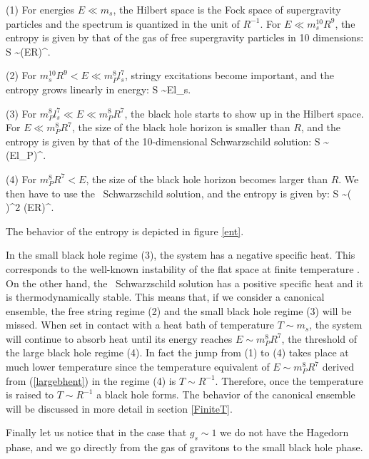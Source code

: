 \noindent
(1) For energies $E \ll m_s$, the Hilbert space is the
Fock space of supergravity particles and the spectrum is
quantized in the unit of $R^{-1}$. For 
$E \ll m_s^{10} R^9$, the entropy is given by that
of the gas of free supergravity particles in 10 dimensions: 
\beq
S \sim (ER)^{}.
\eeq 

\noindent
(2)  For $m_s^{10} R^9 < E \ll m_P^8 l_s^7 $, stringy
excitations become important, and the entropy grows
linearly in energy: 
\beq
S \sim El_s.
\eeq 

\noindent
(3) 
For $m_P^8 l_s^7 \ll E \ll m_P^8 R^7$,
the black hole 
starts to show up in the Hilbert space. 
For $E \ll m_P^8 R^7$, the size of the black hole
horizon is smaller than $R$, and the entropy is given by
that of the 10-dimensional Schwarzschild solution:
\beq
S \sim  (El_P)^{}.
\eeq

\noindent
(4) For $m_P^8 R^7 < E$, the size of the black hole
horizon becomes larger than $R$. We then have to use
the \adsp\ Schwarzschild solution, and the entropy is
given by:
\beq
S \sim \left( \right)^{2}
(ER)^{}.
\label{largebhent}
\eeq

\noindent
The behavior of the entropy is depicted in figure
\ref{ent}. 

In the small black hole regime (3),
the system has a negative specific heat. This
corresponds to the well-known instability
of the flat space at finite temperature \cite{Gross:1982cv}. 
On the other hand, the \ads\ Schwarzschild solution
has a positive specific heat and it is thermodynamically stable.
This means that, if we consider a canonical ensemble, the
free string regime (2) and the small black hole regime
(3) will be missed. When set in contact
with a heat bath of temperature $T \sim m_s$, the
system will continue to absorb heat until its energy
reaches $E \sim m_P^8 R^7$, 
the threshold of the large black hole regime (4). 
In fact the jump from (1) to (4) takes place at much
lower temperature since 
the temperature equivalent of $E \sim m_P^8 R^7$
derived from (\ref{largebhent}) in the regime (4)
is $T \sim R^{-1}$. Therefore, once the temperature is
raised to $T \sim R^{-1}$ a black hole forms.
 The behavior of the canonical
ensemble will be discussed in more detail in section \ref{FiniteT}. 

Finally let us notice that in the case that $g_s \sim 1$ we 
do not have the Hagedorn phase, and we go directly from the gas of
gravitons to the small black hole phase. 



